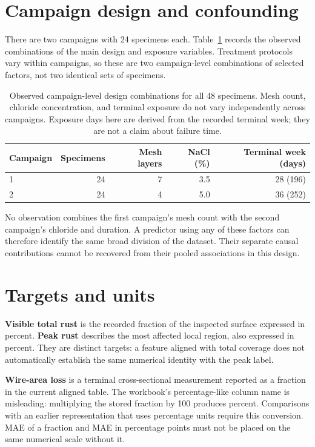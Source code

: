 \section{Campaign design and confounding}
There are two campaigns with 24 specimens each. Table~\ref{tab:design} records the observed combinations of the main design and exposure variables. Treatment protocols vary within campaigns, so these are two campaign-level combinations of selected factors, not two identical sets of specimens.
\begin{table}[htbp]\centering
\caption{Observed campaign-level design combinations for all 48 specimens. Mesh count, chloride concentration, and terminal exposure do not vary independently across campaigns. Exposure days here are derived from the recorded terminal week; they are not a claim about failure time.}\label{tab:design}
\begin{tabular}{lrrrr}\toprule
Campaign & Specimens & Mesh layers & NaCl (\%) & Terminal week (days)\\\midrule
1 & 24 & 7 & 3.5 & 28 (196)\\
2 & 24 & 4 & 5.0 & 36 (252)\\\bottomrule
\end{tabular}
\end{table}
No observation combines the first campaign's mesh count with the second campaign's chloride and duration. A predictor using any of these factors can therefore identify the same broad division of the dataset. Their separate causal contributions cannot be recovered from their pooled associations in this design.

\section{Targets and units}\label{sec:targets}
\textbf{Visible total rust} is the recorded fraction of the inspected surface expressed in percent. \textbf{Peak rust} describes the most affected local region, also expressed in percent. They are distinct targets: a feature aligned with total coverage does not automatically establish the same numerical identity with the peak label.

\textbf{Wire-area loss} is a terminal cross-sectional measurement reported as a fraction in the current aligned table. The workbook's percentage-like column name is misleading: multiplying the stored fraction by 100 produces percent. Comparisons with an earlier representation that uses percentage units require this conversion. MAE of a fraction and MAE in percentage points must not be placed on the same numerical scale without it.

